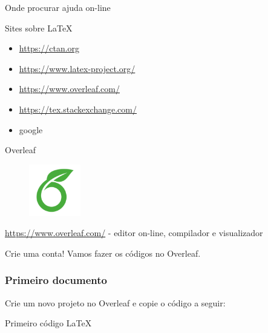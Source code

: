 \documentclass{beamer}
\begin{document}

\begin{frame}{Onde procurar ajuda on-line}

    \begin{block}{Sites sobre \LaTeX{}}
        \begin{itemize}
            \item \url{https://ctan.org}
            \item \url{https://www.latex-project.org/}
            \item \url{https://www.overleaf.com/}
            \item \url{https://tex.stackexchange.com/}
            \item google
        \end{itemize}
    \end{block}
\end{frame}


\begin{frame}{Overleaf}
    
    \begin{figure}
        \centering
        \includegraphics[width = 0.2\textwidth]{Figuras/overleaf_og_logo.png}
        \label{fig:my_label}
    \end{figure}
    \centering \url{https://www.overleaf.com/} - editor on-line, compilador e visualizador
    \vspace{2cm}
    
    \centering Crie uma conta! Vamos fazer os códigos no Overleaf.
    
\end{frame}


\begin{frame}[fragile]
    \frametitle{Primeiro documento}
    
    Crie um novo projeto no Overleaf e copie o código a seguir:
    
    \begin{block}{Primeiro código \LaTeX{}}
            
    \end{block}
    
\end{frame}
\end{document}
